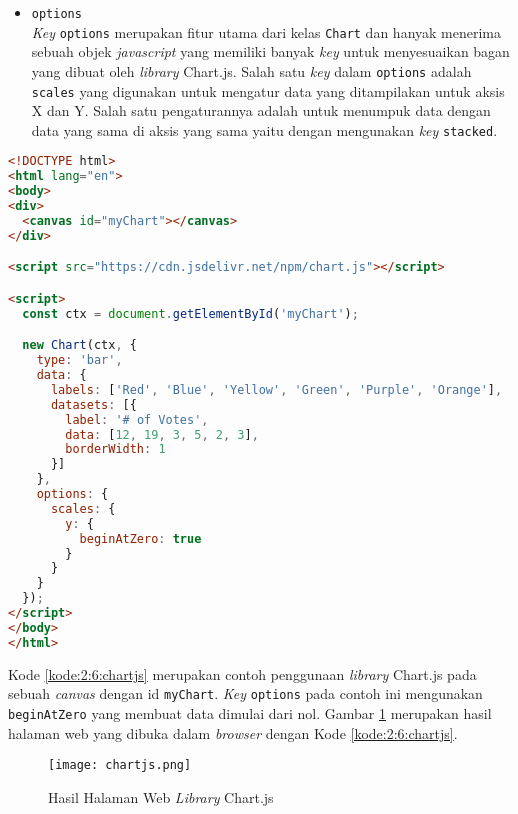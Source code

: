 \begin{itemize}
	\item \verb|options| \\
	\textit{Key} \verb|options| merupakan fitur utama dari kelas \verb|Chart| dan hanyak menerima sebuah objek \textit{javascript} yang memiliki banyak \textit{key} untuk menyesuaikan bagan yang dibuat oleh \textit{library} Chart.js. Salah satu \textit{key} dalam \verb|options| adalah \verb|scales| yang digunakan untuk mengatur data yang ditampilakan untuk aksis X dan Y. Salah satu pengaturannya adalah untuk menumpuk data dengan data yang sama di aksis yang sama yaitu dengan mengunakan \textit{key} \verb|stacked|.
\end{itemize}

\begin{lstlisting}[language={html}, caption={Contoh kode pengunaan Chart.js}, label={kode:2:6:chartjs}]
<!DOCTYPE html>
<html lang="en">
<body>
<div>
  <canvas id="myChart"></canvas>
</div>

<script src="https://cdn.jsdelivr.net/npm/chart.js"></script>

<script>
  const ctx = document.getElementById('myChart');

  new Chart(ctx, {
    type: 'bar',
    data: {
      labels: ['Red', 'Blue', 'Yellow', 'Green', 'Purple', 'Orange'],
      datasets: [{
        label: '# of Votes',
        data: [12, 19, 3, 5, 2, 3],
        borderWidth: 1
      }]
    },
    options: {
      scales: {
        y: {
          beginAtZero: true
        }
      }
    }
  });
</script>
</body>
</html>
\end{lstlisting}

Kode \ref{kode:2:6:chartjs} merupakan contoh penggunaan \textit{library} Chart.js pada sebuah \textit{canvas} dengan id \verb|myChart|. \textit{Key} \verb|options| pada contoh ini mengunakan \verb|beginAtZero| yang membuat data dimulai dari nol. Gambar \ref{fig:2:6:chartjs} merupakan hasil halaman web yang dibuka dalam \textit{browser} dengan Kode \ref{kode:2:6:chartjs}.

\begin{figure}[H]
	\centering
	\texttt{[image: chartjs.png]}
	\caption{Hasil Halaman Web \textit{Library} Chart.js}
	\label{fig:2:6:chartjs}
\end{figure}